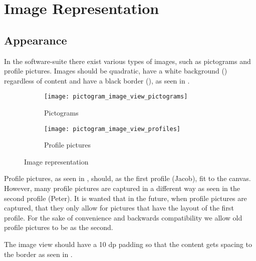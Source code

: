 
\chapter{Image Representation}

\section{Appearance}
\label{sec:appearance}
In the \giraf software-suite there exist various types of images, such as pictograms and profile pictures. Images should be quadratic, have a white background () regardless of content and have a black border (), as seen in . 

\begin{figure}[!htbp]
    \centering

    \begin{subfigure}[t]{0.4\textwidth}
    	\centering
        \texttt{[image: pictogram\_image\_view\_pictograms]}
        \caption{Pictograms}
        \label{fig:pictogram_image_view_pictograms}
    \end{subfigure}
    \hspace{5em} 
    \begin{subfigure}[t]{0.4\textwidth}
    	\centering
        \texttt{[image: pictogram\_image\_view\_profiles]}
        \caption{Profile pictures}
        \label{fig:pictogram_image_view_profiles}
    \end{subfigure}
    
    \caption{Image representation}
    \label{fig:pictogram_image_view}
\end{figure}

\begin{note}
	Profile pictures, as seen in , should, as the first profile (Jacob), fit to the canvas. However, many profile pictures are captured in a different way as seen in the second profile (Peter). It is wanted that in the future, when profile pictures are captured, that they only allow for pictures that have the layout of the first profile. For the sake of convenience and backwards compatibility we allow old profile pictures to be as the second.
\end{note}

\noindent
The image view should have a 10 dp padding so that the content gets spacing to the border as seen in .

